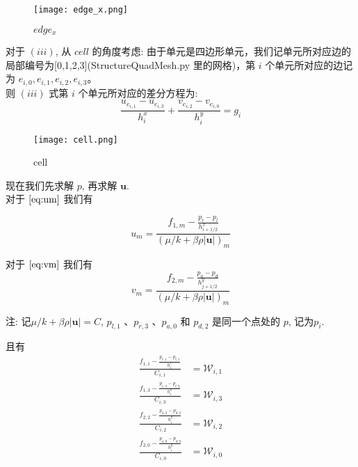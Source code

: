 \documentclass[leqno]{article}
\begin{document}
\begin{figure}[H] 
\centering 
\texttt{[image: edge\_x.png]} 
\caption{$edge_x$} 
\label{fig:label} 
\end{figure}

对于 $(iii)$, 从 $cell$ 的角度考虑:
由于单元是四边形单元，我们记单元所对应边的局部编号为[0,1,2,3](StructureQuadMesh.py 里的网格)，第 $i$ 个单元所对应的边记为 $e_{i,0},e_{i,1},e_{i,2},e_{i,3}$。\\

则 $(iii)$ 式第 $i$ 个单元所对应的差分方程为:\\

\begin{equation}\label{eq:uv}
\frac{u_{e_{i,1}} - u_{e_{i,3}}}{h^x_i} + \frac{v_{e_{i,2}} - v_{e_{i,0}}}{h^y_i} = g_i
\end{equation}

\begin{figure}[H] 
\centering 
\texttt{[image: cell.png]} 
\caption{cell} 
\label{fig:label} 
\end{figure}

现在我们先求解 $p$, 再求解 $\boldsymbol{u}$.\\

对于 $\eqref{eq:um}$ 我们有

\begin{equation}\label{eq:up}
u_m = \frac{f_{1,m} - \frac{p_{r} - p_{l}}{h^x_{i+1/2}}}{(\mu/k+\beta\rho\left|\boldsymbol{u}\right|)_m} 
\end{equation}

对于 $\eqref{eq:vm}$ 我们有
\begin{equation}\label{eq:vp}
v_m = \frac{f_{2,m} - \frac{p_{a} - p_{d}}{h^y_{j+1/2}}}{(\mu/k+\beta\rho\left|\boldsymbol{u}\right|)_m} 
\end{equation}

注: 记$\mu/k+\beta\rho\left|\boldsymbol{u}\right| = C$,  $p_{l,1}$ 、$p_{r,3}$ 、$p_{a,0}$ 和 $p_{d,2}$ 是同一个点处的 $p$, 记为$p_i$.

且有
\begin{equation*}
\begin{aligned}
\frac{f_{1,1} - \frac{p_{r,1} - p_{l,1}}{h^x_i}}{C_{i,1}} & = \mathcal{W}_{i,1} \\
\frac{f_{1,3} - \frac{p_{r,3} - p_{l,3}}{h^x_i}}{C_{i,3}} & = \mathcal{W}_{i,3} \\
\frac{f_{2,2} - \frac{p_{a,2} - p_{d,2}}{h^y_i}}{C_{i,2}} & = \mathcal{W}_{i,2} \\
\frac{f_{2,0} - \frac{p_{a,0} - p_{d,0}}{h^y_i}}{C_{i,0}} & = \mathcal{W}_{i,0}
\end{aligned}
\end{equation*}\\
\end{document}
